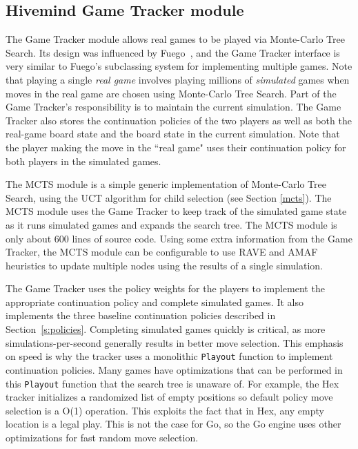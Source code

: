 \documentclass{acm_proc_article-sp}
\begin{document}

\subsection{Hivemind Game Tracker module}
\label{s:tracker}

The Game Tracker module allows real games to be played via Monte-Carlo Tree Search.
Its design was influenced by Fuego~\cite{Fuego},  and the Game Tracker interface is very similar to Fuego's subclassing system for implementing multiple games.
Note that playing a single \emph{real game} involves playing millions of  \emph{simulated} games when
moves in the real game are chosen using Monte-Carlo Tree Search.
Part of the Game Tracker's responsibility is to maintain the 
current simulation.
The Game Tracker also stores the continuation policies of the two players as well as both
the real-game board state and the board state in the current simulation.
Note that the player making the move in the ``real game" uses their continuation policy for both players in the simulated games.

The MCTS  module is a simple 
generic implementation of Monte-Carlo Tree Search, using the UCT algorithm for child selection
(see Section \ref{mcts}).
The MCTS module uses the Game Tracker to keep track of the simulated game state 
as it runs simulated games and expands the search tree.
The MCTS module is only about 600 lines of source code. 
Using some extra information from the Game Tracker,  
the MCTS module can be configurable to use RAVE and AMAF heuristics to 
update multiple nodes using the results of a single simulation.  

The Game Tracker uses the policy weights for the players to implement the appropriate continuation policy and complete simulated games. 
It also implements the three baseline continuation policies described in Section~\ref{s:policies}.
Completing simulated games quickly is critical, as more simulations-per-second generally results in better move selection. 
This emphasis on speed is why the tracker uses a monolithic \texttt{Playout} function
to implement continuation policies.
Many games have optimizations that can be performed in this \texttt{Playout} function that the search tree is unaware of. 
For example, the Hex tracker initializes a randomized list of empty positions so default policy move selection is a O(1) operation. 
This exploits the fact that in Hex, any empty location is a legal play. 
This is not the case for Go, so the Go engine uses other optimizations for fast random move selection.
\end{document}
